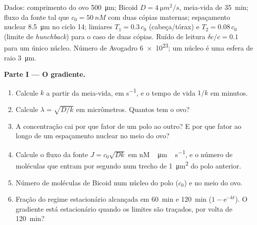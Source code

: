 \begin{problem}
\label{pb:b3:developmental-genetics:1}
Dados: comprimento do ovo \qty{500}{\micro m}; Bicoid $D = \qty{4}{\micro m^2/s}$,
meia-vida de \qty{35}{min}; fluxo da fonte tal que $c_{0} = \qty{50}{nM}$
com duas cópias maternas; espaçamento nuclear \qty{8.5}{\micro m} no
ciclo 14; limiares $T_{1} = 0.3\,c_{0}$ (cabeça/tórax) e $T_{2} =
0.08\,c_{0}$ (limite de \emph{hunchback}) para o caso de duas cópias.
Ruído de leitura $\delta c/c = 0.1$ para um único núcleo. Número de
Avogadro \qty{6e23}{}; um núcleo é uma esfera de raio \qty{3}{\micro m}.

\medskip
\noindent\textbf{Parte I --- O gradiente.}
\begin{enumerate}
  \item Calcule $k$ a partir da meia-vida, em \unit{s^{-1}}, e o tempo
        de vida $1/k$ em minutos.
  \item Calcule $\lambda = \sqrt{D/k}$ em micrômetros. Quantos
         tem o ovo?
  \item A concentração cai por que fator de um polo ao outro? E por que
        fator ao longo de um espaçamento nuclear no meio do ovo?
  \item Calcule o fluxo da fonte $J = c_{0}\sqrt{Dk}$ em
        \unit{nM\,\micro m\,s^{-1}}, e o número de moléculas que entram
        por segundo num trecho de \qty{1}{\micro m^2} do polo anterior.
  \item Número de moléculas de Bicoid num núcleo do polo ($c_{0}$) e no
        meio do ovo.
  \item Fração do regime estacionário alcançada em \qty{60}{min} e
        \qty{120}{min} ($1 - \mathrm{e}^{-kt}$). O gradiente está
        estacionário quando os limites são traçados, por volta de
        \qty{120}{min}?
\end{enumerate}


\end{problem}
